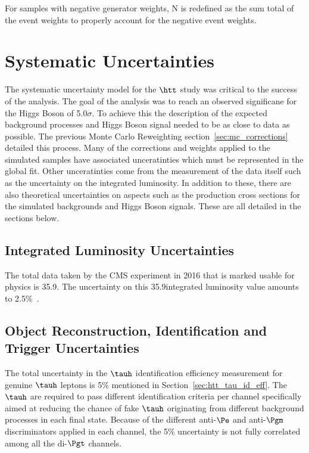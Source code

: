 For samples with negative generator weights, N is redefined as the sum total of the event weights to
properly account for the negative event weights.




\section{Systematic Uncertainties}
\label{sec:htt_systematics}

The systematic uncertainty model for the $\htt$ study was critical to the success of the analysis.
The goal of the analysis was to reach an observed significane for the Higgs Boson of 5.0$\sigma$.
To achieve this the description of the expected background processes and Higgs Boson signal
needed to be as close to data as possible. The previous Monte Carlo Reweighting 
section~\ref{sec:mc_corrections} detailed this process. Many of the corrections and weights applied
to the simulated samples have associated unceratinties which must be represented in the
global fit. Other unceratinties come from the measurement of the data itself such as the uncertainty
on the integrated luminosity. In addition to these, there are also theoretical uncertainties on
aspects such as the production cross sections for the simulated backgrounds and Higgs Boson signals. 
These are all detailed in the sections below.


\subsection{Integrated Luminosity Uncertainties}
The total data taken by the CMS experiment in 2016 that is marked usable for physics is 35.9\fbinv. The uncertainty
on this 35.9\fbinv integrated luminosity value amounts to 2.5\%~\cite{CMS-PAS-LUM-17-001}.


\subsection{Object Reconstruction, Identification and Trigger Uncertainties}
The total uncertainty in the $\tauh$ identification efficiency measurement for genuine $\tauh$ leptons is 
5\% mentioned in Section~\ref{sec:htt_tau_id_eff}.
The $\tauh$ are required to pass different identification criteria per channel
specifically aimed at reducing the chance of fake $\tauh$ originating from different background
processes in each final state. Because of the different anti-$\Pe$ and anti-$\Pgm$ discriminators
applied in each channel, the 5\% uncertainty is not fully correlated among all the di-$\Pgt$ channels.

